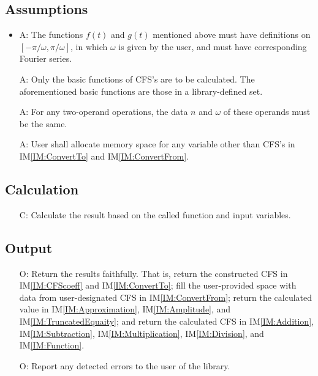 \documentclass[12pt]{article}
\newcounter{assumpnum} %
\newcounter{calnum} %
\newcounter{outputnum} %
\newcommand{\iref}[1]{IM\ref{#1}}
\begin{document}
\subsection{Assumptions}
\newcommand{\aitem}[1]{\item[A\refstepcounter{assumpnum}\theassumpnum \label{Ass:#1}:] }
\begin{itemize}

\aitem{FunctionProperty}
The functions $f(t)$ and $g(t)$ mentioned above must have definitions on 
$[-\pi/\omega, \pi/\omega]$, in which $\omega$ is given by the user, 
and must have corresponding Fourier series.
\item[A\refstepcounter{assumpnum}\theassumpnum \label{Ass:BasicFunction}:] 
Only the basic functions of CFS's are to be calculated. The aforementioned 
basic functions are those in a library-defined set.
\item[A\refstepcounter{assumpnum}\theassumpnum \label{Ass:CFSPropertyMatch}:] 
For any two-operand operations, the data $n$ and $\omega$ of these operands 
must be the same. 
\item[A\refstepcounter{assumpnum}\theassumpnum \label{Ass:Memory}:] 
User shall allocate memory space for any variable other than 
CFS's in \iref{IM:ConvertTo} and \iref{IM:ConvertFrom}.
\end{itemize}

\subsection{Calculation} \label{sec_Calculation}
\begin{itemize}
\item[C\refstepcounter{calnum}\thecalnum \label{Cal:Normal}:] 
Calculate the result based on the called function and input variables.

\end{itemize}
\subsection{Output} \label{sec_Output}    
\begin{itemize}
\item[O\refstepcounter{outputnum}\theoutputnum \label{Output:Faithful}:] 
Return the results faithfully. That is, return the constructed CFS in \iref{IM:CFScoeff} and \iref{IM:ConvertTo}; fill the user-provided space with data from user-designated CFS in \iref{IM:ConvertFrom}; return the calculated value in \iref{IM:Approximation}, \iref{IM:Amplitude}, and \iref{IM:TruncatedEquaity}; and return the calculated CFS in \iref{IM:Addition}, \iref{IM:Subtraction}, \iref{IM:Multiplication}, \iref{IM:Division}, and \iref{IM:Function}. 
\item[O\refstepcounter{outputnum}\theoutputnum \label{Output:Error}:] 
Report any detected errors to the user of the library.
\end{itemize}
\end{document}

